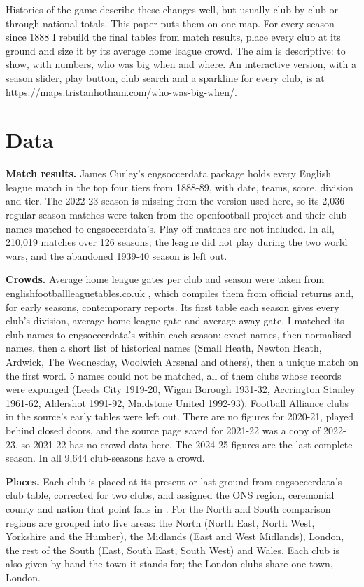 \documentclass[11pt,a4paper]{article}
\begin{document}
Histories of the game describe these changes well, but usually club by club or through national totals. This paper puts them on one map. For every season since 1888 I rebuild the final tables from match results, place every club at its ground and size it by its average home league crowd. The aim is descriptive: to show, with numbers, who was big when and where. An interactive version, with a season slider, play button, club search and a sparkline for every club, is at \url{https://maps.tristanhotham.com/who-was-big-when/}.

\section{Data}
\textbf{Match results.} James Curley's engsoccerdata package \citep{curley} holds every English league match in the top four tiers from 1888-89, with date, teams, score, division and tier. The 2022-23 season is missing from the version used here, so its 2,036 regular-season matches were taken from the openfootball project \citep{openfootball} and their club names matched to engsoccerdata's. Play-off matches are not included. In all, 210,019 matches over 126 seasons; the league did not play during the two world wars, and the abandoned 1939-40 season is left out.

\textbf{Crowds.} Average home league gates per club and season were taken from englishfootballleaguetables.co.uk \citep{eflt}, which compiles them from official returns and, for early seasons, contemporary reports. Its first table each season gives every club's division, average home league gate and average away gate. I matched its club names to engsoccerdata's within each season: exact names, then normalised names, then a short list of historical names (Small Heath, Newton Heath, Ardwick, The Wednesday, Woolwich Arsenal and others), then a unique match on the first word. 5 names could not be matched, all of them clubs whose records were expunged (Leeds City 1919-20, Wigan Borough 1931-32, Accrington Stanley 1961-62, Aldershot 1991-92, Maidstone United 1992-93). Football Alliance clubs in the source's early tables were left out. There are no figures for 2020-21, played behind closed doors, and the source page saved for 2021-22 was a copy of 2022-23, so 2021-22 has no crowd data here. The 2024-25 figures are the last complete season. In all 9,644 club-seasons have a crowd.

\textbf{Places.} Each club is placed at its present or last ground from engsoccerdata's club table, corrected for two clubs, and assigned the ONS region, ceremonial county and nation that point falls in \citep{ons}. For the North and South comparison regions are grouped into five areas: the North (North East, North West, Yorkshire and the Humber), the Midlands (East and West Midlands), London, the rest of the South (East, South East, South West) and Wales. Each club is also given by hand the town it stands for; the London clubs share one town, London.
\end{document}
